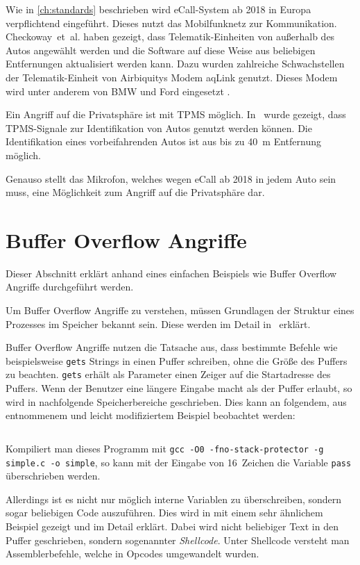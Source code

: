 Wie in \cref{ch:standards} beschrieben wird eCall-System ab 2018 in Europa
verpflichtend eingeführt. Dieses nutzt das Mobilfunknetz zur Kommunikation.
Checkoway~et~al. haben gezeigt, dass Telematik-Einheiten von außerhalb des
Autos angewählt werden und die Software auf diese Weise aus beliebigen
Entfernungen aktualisiert werden kann. Dazu wurden zahlreiche Schwachstellen
der Telematik-Einheit von Airbiquitys Modem aqLink genutzt. Dieses Modem wird
unter anderem von BMW und Ford eingesetzt \cite{AirbiquityBMW,AirbiquityFord}.

Ein Angriff auf die Privatsphäre ist mit TPMS möglich. In~\cite{Rouf2010} wurde
gezeigt, dass TPMS-Signale zur Identifikation von Autos genutzt werden können.
Die Identifikation eines vorbeifahrenden Autos ist aus bis zu \SI{40}{\meter}
Entfernung möglich.

Genauso stellt das Mikrofon, welches wegen eCall ab 2018 in jedem Auto sein
muss, eine Möglichkeit zum Angriff auf die Privatsphäre dar.


\section{Buffer Overflow Angriffe}\label{sec:Buffer-Overflow}
Dieser Abschnitt erklärt anhand eines einfachen Beispiels wie Buffer Overflow
Angriffe durchgeführt werden.

Um Buffer Overflow Angriffe zu verstehen, müssen Grundlagen der Struktur eines
Prozesses im Speicher bekannt sein. Diese werden im Detail
in~\cite{Silberschatz2005} erklärt.

Buffer Overflow Angriffe nutzen die Tatsache aus, dass bestimmte Befehle wie
beispielsweise \verb+gets+ Strings in einen Puffer schreiben, ohne die Größe
des Puffers zu beachten. \verb+gets+ erhält als Parameter einen Zeiger auf die
Startadresse des Puffers. Wenn der Benutzer eine längere Eingabe macht als der
Puffer erlaubt, so wird in nachfolgende Speicherbereiche geschrieben. Dies kann
an folgendem, aus~\cite{Arora2013} entnommenem und leicht modifiziertem
Beispiel beobachtet werden:

\inputminted[linenos, numbersep=5pt, tabsize=4, frame=lines, label=simple.c]{c}{content/exploit-buffer-overflow/simple.c}

Kompiliert man dieses Programm mit
\verb+gcc -O0 -fno-stack-protector -g simple.c -o simple+, so kann mit der
Eingabe von 16~Zeichen die Variable \verb+pass+ überschrieben werden.

Allerdings ist es nicht nur möglich interne Variablen zu überschreiben, sondern
sogar beliebigen Code auszuführen. Dies wird in \cite{Mixter} mit einem sehr
ähnlichem Beispiel gezeigt und im Detail erklärt. Dabei wird nicht beliebiger
Text in den Puffer geschrieben, sondern sogenannter \textit{Shellcode}. Unter
Shellcode versteht man Assemblerbefehle, welche in Opcodes umgewandelt wurden.


